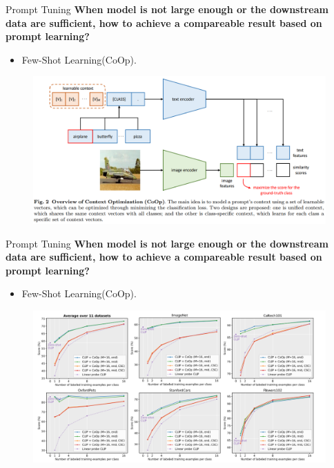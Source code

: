 \documentclass[notheorems, aspectratio=54]{beamer}
\begin{document}
\begin{frame}{Prompt Tuning}
  \textbf{When model is not large enough or the downstream data are sufficient, how to achieve a compareable result based on prompt learning?}
  \begin{itemize}
    \item Few-Shot Learning(CoOp).  
  \end{itemize}

  \begin{figure}[!h]
    \centering
    \includegraphics[width=1\linewidth]{figures/CoOp-fig2.png}
  \end{figure}
\end{frame}

\begin{frame}{Prompt Tuning}
  \textbf{When model is not large enough or the downstream data are sufficient, how to achieve a compareable result based on prompt learning?}
  \begin{itemize}
    \item Few-Shot Learning(CoOp).  
  \end{itemize}

  \begin{figure}[!h]
    \centering
    \includegraphics[width=0.9\linewidth]{figures/CoOp-fig3.png}
  \end{figure}
\end{frame}
\end{document}
